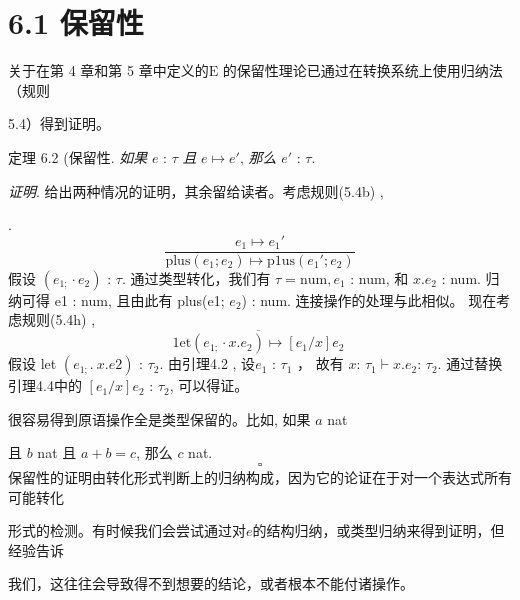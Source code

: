 \section{6.1 保留性}%

关于在第 4 章和第 5 章中定义的$\mathrm{E}$ 的保留性理论已通过在转换系统上使用归纳法（规则


5.4）得到证明。%

定理  6.2 (保留性. {\it 如果} $e$ : $\tau$ {\it 且} $e\mapsto e'$, {\it 那么} $e'$ : $\tau.$

{\it 证明}. 给出两种情况的证明，其余留给读者。考虑规则(5.4b) ,%

.
$$
\frac{e_{1}\mapsto e_{1}'}{\mathrm{p}\mathrm{l}\mathrm{u}\mathrm{s}(e_{1};e_{2})\mapsto \mathrm{p}1\mathrm{u}\mathrm{s}(e_{1}';e_{2})}
$$
假设 $(e_{1;}\cdot e_{2})$ : $\tau$. 通过类型转化，我们有 $\tau=\mathrm{n}\mathrm{u}\mathrm{m}, e_{1}$ : num, 和 $x.e_{2}$ : num.
归纳可得 e1 : num, 且由此有 plus(e1; $e_{2}$) : num. 连接操作的处理与此相似。
现在考虑规则(5.4h) ,
$$
\overline{1\mathrm{e}\mathrm{t}(e_{1;}\cdot x.e_{2})\mapsto[e_{1}/x]e_{2}}\ 
$$
假设 let $(e_{1;}.\ x.e2)$ : $\tau_{2}$. 由引理4.2 , 设$e_{1}$ : $\tau_{1}$ ， 故有 $x$: $\tau_{1} \vdash x.e_{2}$:
$\tau_{2}$. 通过替换引理4.4中的 $[e_{1}/x]e_{2}$ : $\tau_{2}$, 可以得证。

很容易得到原语操作全是类型保留的。比如, 如果 $a$ nat

且 $b$ nat 且 $a+b=c$, 那么 $c$ nat.
$$
\square 
$$
保留性的证明由转化形式判断上的归纳构成，因为它的论证在于对一个表达式所有可能转化

形式的检测。有时候我们会尝试通过对$e$的结构归纳，或类型归纳来得到证明，但经验告诉


我们，这往往会导致得不到想要的结论，或者根本不能付诸操作。
